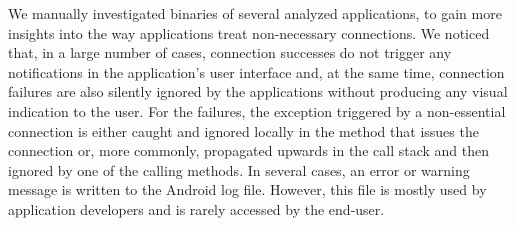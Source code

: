 We manually investigated binaries of several analyzed applications, to gain more insights into the way applications treat non-necessary connections. %
We noticed that, in a large number of cases, connection successes do not trigger any notifications in the application's user interface and, at the same time, connection failures are also silently ignored by the applications without producing any visual indication to the user. 
For the failures, the exception triggered by a non-essential connection is either caught and ignored locally in the method that issues the connection or, more commonly, propagated upwards in the call stack and then ignored by one of the calling methods. In several cases, an error or warning message is written to the Android log file. However, this file is mostly used by  application developers and is rarely accessed by the end-user.













